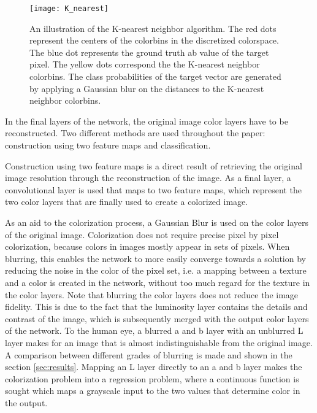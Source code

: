 \begin{wrapfigure}{R}{0.5\textwidth}
	\vspace{-30pt}
	\begin{center}
		\texttt{[image: K\_nearest]}
	\end{center}
	\caption{An illustration of the K-nearest neighbor algorithm. The red dots represent the centers of the colorbins in the discretized colorspace. The blue dot represents the ground truth ab value of the target pixel. The yellow dots correspond the the K-nearest neighbor colorbins. The class probabilities of the target vector are generated by applying a Gaussian blur on the distances to the K-nearest neighbor colorbins.}
	\vspace{-5pt}
	\label{fig:k_nearest}
\end{wrapfigure}

In the final layers of the network, the original image color layers have to be reconstructed. Two different methods are used throughout the paper: construction using two feature maps and classification.

Construction using two feature maps is a direct result of retrieving the original image resolution through the reconstruction of the image. As a final layer, a convolutional layer is used that maps to two feature maps, which represent the two color layers that are finally used to create a colorized image.

As an aid to the colorization process, a Gaussian Blur is used on the color layers of the original image. Colorization does not require precise pixel by pixel colorization, because colors in images mostly appear in sets of pixels. When blurring, this enables the network to more easily converge towards a solution by reducing the noise in the color of the pixel set, i.e. a mapping between a texture and a color is created in the network, without too much regard for the texture in the color layers. Note that blurring the color layers does not reduce the image fidelity. This is due to the fact that the luminosity layer contains the details and contrast of the image, which is subsequently merged with the output color layers of the network. To the human eye, a blurred a and b layer with an unblurred L layer makes for an image that is almost indistinguishable from the original image. A comparison between different grades of blurring is made and shown in the section \ref{sec:results}. Mapping an L layer directly to an a and b layer makes the colorization problem into a regression problem, where a continuous function is sought which maps a grayscale input to the two values that determine color in the output.


